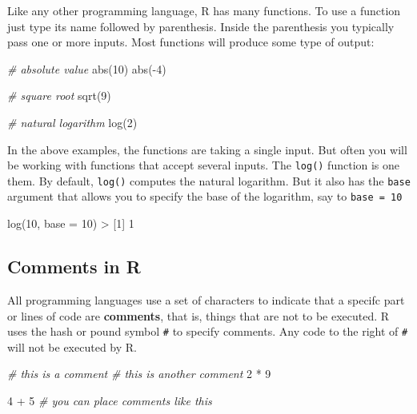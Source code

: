 \documentclass[
]{book}
\newenvironment{Shaded}{\begin{snugshade}}{\end{snugshade}}
\newcommand{\AttributeTok}[1]{\textcolor[rgb]{0.77,0.63,0.00}{#1}}
\newcommand{\CommentTok}[1]{\textcolor[rgb]{0.56,0.35,0.01}{\textit{#1}}}
\newcommand{\DecValTok}[1]{\textcolor[rgb]{0.00,0.00,0.81}{#1}}
\newcommand{\FunctionTok}[1]{\textcolor[rgb]{0.00,0.00,0.00}{#1}}
\newcommand{\NormalTok}[1]{#1}
\newcommand{\SpecialCharTok}[1]{\textcolor[rgb]{0.00,0.00,0.00}{#1}}
\begin{document}
Like any other programming language, R has many functions. To use a function
just type its name followed by parenthesis. Inside the parenthesis you
typically pass one or more inputs. Most functions will produce some type of
output:

\begin{Shaded}
\begin{Highlighting}[]
\CommentTok{\# absolute value}
\FunctionTok{abs}\NormalTok{(}\DecValTok{10}\NormalTok{)}
\FunctionTok{abs}\NormalTok{(}\SpecialCharTok{{-}}\DecValTok{4}\NormalTok{)}

\CommentTok{\# square root}
\FunctionTok{sqrt}\NormalTok{(}\DecValTok{9}\NormalTok{)}

\CommentTok{\# natural logarithm}
\FunctionTok{log}\NormalTok{(}\DecValTok{2}\NormalTok{)}
\end{Highlighting}
\end{Shaded}

In the above examples, the functions are taking a single input. But often you
will be working with functions that accept several inputs. The \texttt{log()} function
is one them. By default, \texttt{log()} computes the natural logarithm. But it also
has the \texttt{base} argument that allows you to specify the base of the logarithm,
say to \texttt{base\ =\ 10}

\begin{Shaded}
\begin{Highlighting}[]
\FunctionTok{log}\NormalTok{(}\DecValTok{10}\NormalTok{, }\AttributeTok{base =} \DecValTok{10}\NormalTok{)}
\SpecialCharTok{\textgreater{}}\NormalTok{ [}\DecValTok{1}\NormalTok{] }\DecValTok{1}
\end{Highlighting}
\end{Shaded}

\hypertarget{comments-in-r}{%
\subsection{Comments in R}\label{comments-in-r}}

All programming languages use a set of characters to indicate that a
specifc part or lines of code are \textbf{comments}, that is, things that are
not to be executed. R uses the hash or pound symbol \texttt{\#} to specify comments.
Any code to the right of \texttt{\#} will not be executed by R.

\begin{Shaded}
\begin{Highlighting}[]
\CommentTok{\# this is a comment}
\CommentTok{\# this is another comment}
\DecValTok{2} \SpecialCharTok{*} \DecValTok{9}

\DecValTok{4} \SpecialCharTok{+} \DecValTok{5}  \CommentTok{\# you can place comments like this}
\end{Highlighting}
\end{Shaded}
\end{document}
